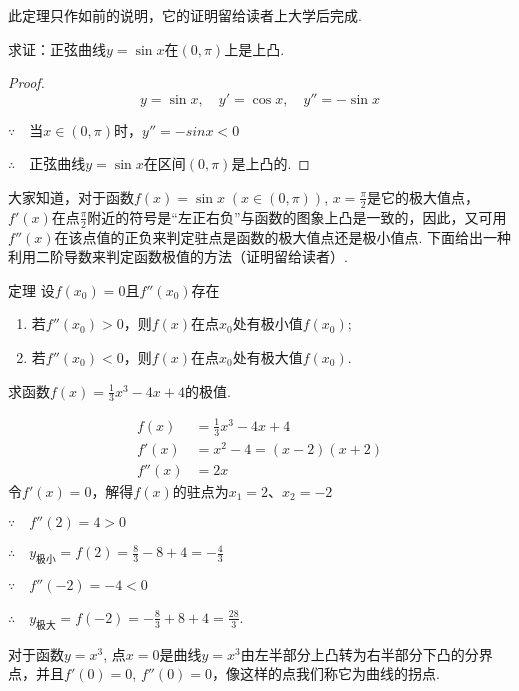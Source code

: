此定理只作如前的说明，它的证明留给读者上大学后完成.

\begin{example}
    求证：正弦曲线$y=\sin x$在$(0,\pi)$上是上凸.
\end{example}

\begin{proof}
\[y=\sin x,\quad y'=\cos x,\quad y''=-\sin x\]

$\because\quad $当$x\in(0,\pi)$时，$y''=-sinx<0$

$\therefore\quad $正弦曲线$y=\sin x$在区间$(0,\pi)$是上凸的.
\end{proof}

大家知道，对于函数$f(x)=\sin x\; (x\in (0,\pi))$, $x=\frac{\pi}{2}$是它的极大值点，$f'(x)$在点$\frac{\pi}{2}$附近的符号是“左正右负”与函数的图象上凸是一致的，因此，又可用$f''(x)$在该点值的正负来判定驻点是函数的极大值点还是极小值点. 下面给出一种利用二阶导数来判定函数极值的方法（证明留给读者）.

\begin{thm}
    {定理} 设$f(x_0)=0$且$f''(x_0)$存在
\begin{enumerate}[(1)]
\item 若$f''(x_0)>0$，则$f(x)$在点$x_0$处有极小值$f(x_0)$;
\item 若$f''(x_0)<0$，则$f(x)$在点$x_0$处有极大值$f(x_0)$.
\end{enumerate}
\end{thm}


\begin{example}
    求函数$f(x)=\frac{1}{3}x^3-4x+4$的极值.
\end{example}

\begin{solution}
\[\begin{split}
    f(x)&=\frac{1}{3}x^3-4x+4\\
f'(x)&=x^2-4=(x-2)(x+2)\\
f''(x)&=2x
\end{split}\]
令$f'(x)=0$，解得$f(x)$的驻点为$x_1=2$、$x_2=-2$

$\because\quad f''(2)=4>0$

$\therefore\quad y_{\text{极小}}=f(2)=\frac{8}{3}-8+4=-\frac{4}{3}$

$\because\quad f''(-2)=-4<0$

$\therefore\quad y_{\text{极大}}=f(-2)=-\frac{8}{3}+8+4=\frac{28}{3}$.

对于函数$y=x^3$, 点$x=0$是曲线$y=x^3$由左半部分上凸转为右半部分下凸的分界点，并且$f'(0)=0$, $f''(0)=0$，像这样的点我们称它为曲线的拐点.
\end{solution}

